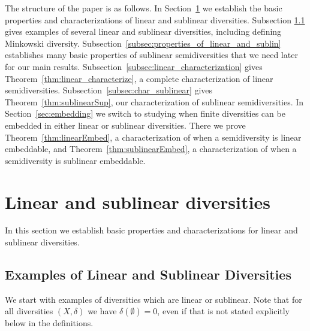 \documentclass[11pt]{article}
\begin{document}
The structure of the paper is as follows.
In Section~\ref{sec:linear_and_sublinear} we establish the basic properties and characterizations of linear and sublinear diversities.
Subsection \ref{subsec:examples_of_lin_and_sublin} gives examples of several linear and sublinear diversities, including defining Minkowski diversity. Subsection~\ref{subsec:properties_of_linear_and_sublin} establishes
many basic properties of  sublinear semidiversities that we need later for our main results.
Subsection~\ref{subsec:linear_characterization} gives Theorem~\ref{thm:linear_characterize}, a complete characterization of linear semidiversities.   Subsection~\ref{subsec:char_sublinear} gives Theorem~\ref{thm:sublinearSup}, our characterization of sublinear semidiversities. In Section~\ref{sec:embedding} we switch to studying when finite diversities can be embedded in either linear or sublinear diversities. 
There we prove Theorem~\ref{thm:linearEmbed}, a characterization of when a semidiversity is linear embeddable, and Theorem~\ref{thm:sublinearEmbed}, a characterization of when a semidiversity is sublinear embeddable. 



\section{Linear and sublinear diversities} \label{sec:linear_and_sublinear}

In this section we establish basic properties and characterizations for linear and sublinear diversities. 

\subsection{Examples of Linear and Sublinear Diversities} \label{subsec:examples_of_lin_and_sublin}

We start with examples of diversities which are linear or sublinear. Note that for all diversities $(X,\delta)$ we have $\delta(\emptyset) = 0$, even if that is not stated explicitly below in the definitions. 
\end{document}
